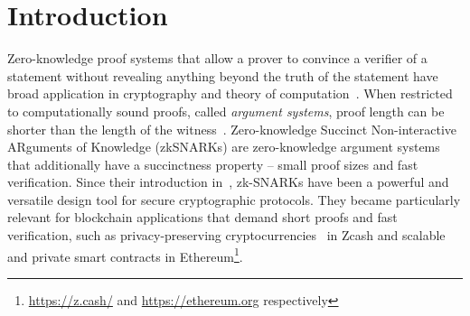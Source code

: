 \section{Introduction}
Zero-knowledge proof systems that allow a prover to convince a verifier of a statement without revealing anything beyond the truth of the statement have broad application in cryptography and theory of computation~\cite{FOCS:GolMicWig86,STOC:Fortnow87,C:BGGHKMR88}.
When restricted to computationally sound proofs, called \emph{argument systems}, proof length can be shorter than the length of the witness~\cite{brassard1988minimum}. 
Zero-knowledge Succinct Non-interactive ARguments of Knowledge (zkSNARKs) are zero-knowledge argument systems that additionally have a succinctness property -- small proof sizes and fast verification. 
Since their introduction in~\cite{FOCS:Micali94}, zk-SNARKs have been a powerful and versatile design tool for secure cryptographic protocols. They became particularly relevant for blockchain applications that demand short proofs and fast verification, such as privacy-preserving cryptocurrencies~\cite{SP:BCGGMT14} in Zcash and scalable and private smart contracts in Ethereum\footnote{\url{https://z.cash/} and \url{https://ethereum.org} respectively}.


